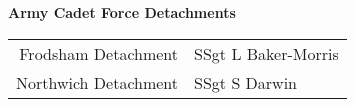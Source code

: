 \begin{center}
  \Large
  \textbf{Army Cadet Force Detachments}
\end{center}

\begin{center}
  \begin{tabular}{rl}
    Frodsham Detachment & SSgt L Baker-Morris \\
    Northwich Detachment & SSgt S Darwin \\
  \end{tabular}
\end{center}

